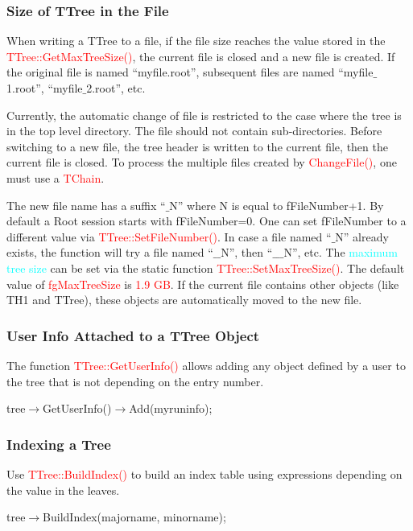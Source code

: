 \documentclass[12pt,a4paper]{article}
\begin{document}
\subsubsection{Size of TTree in the File}
When writing a TTree to a file, if the file size reaches the value stored in the \textcolor{red}{TTree::GetMaxTreeSize()}, the current file is closed and a new file is created. If the original file is named ``myfile.root”, subsequent files are named
``myfile$\_$1.root”, ``myfile$\_$2.root”, etc.

Currently, the automatic change of file is restricted to the case where the tree is in the top level directory. The file should not contain sub-directories. Before switching to a new file, the tree header is written to the current file, then the current file is closed. To process the multiple files created by \textcolor{red}{ChangeFile()}, one must use a \textcolor{red}{TChain}.

The new file name has a suffix ``$\_$N” where N is equal to fFileNumber+1. By default a Root session starts with fFileNumber=0. One can set fFileNumber to a different value via \textcolor{red}{TTree::SetFileNumber()}. In case a file named ``$\_$N” already exists, the function will try a file named ``$\_\_$N”, then ``$\_\_\_$N”, etc. The \textcolor{cyan}{maximum tree size} can be set via the static function \textcolor{red}{TTree::SetMaxTreeSize()}. The default value of \textcolor{red}{fgMaxTreeSize} is \textcolor{red}{1.9 GB}. If the current file contains other objects (like TH1 and TTree), these objects are automatically moved to the new file.

\subsubsection{User Info Attached to a TTree Object}
The function \textcolor{red}{TTree::GetUserInfo()} allows adding any object defined by a user to the tree that is not depending on the entry number. 

tree$\rightarrow$GetUserInfo()$\rightarrow$Add(myruninfo);

\subsubsection{Indexing a Tree}
Use \textcolor{red}{TTree::BuildIndex()} to build an index table using expressions depending on the value in the leaves.

tree$\rightarrow$BuildIndex(majorname, minorname);
\end{document}
